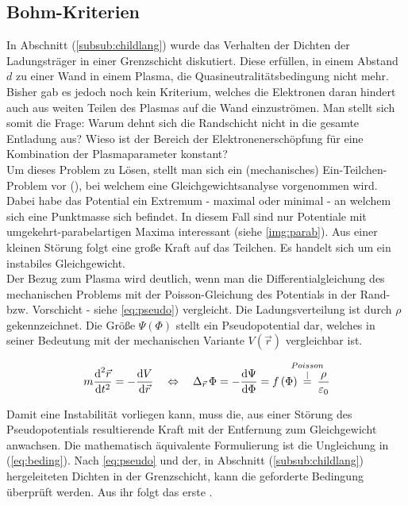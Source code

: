   \subsection{Bohm-Kriterien}

    In Abschnitt (\ref{subsub:childlang}) wurde das Verhalten der Dichten der Ladungstr\"ager in einer Grenzschicht diskutiert. Diese erf\"ullen, in einem Abstand $d$ zu einer Wand in einem Plasma, die Quasineutralit\"atsbedingung nicht mehr. Bisher gab es jedoch noch kein Kriterium, welches die Elektronen daran hindert auch aus weiten Teilen des Plasmas auf die Wand einzustr\"omen. Man stellt sich somit die Frage: Warum dehnt sich die Randschicht nicht in die gesamte Entladung aus? Wieso ist der Bereich der Elektronenersch\"opfung f\"ur eine Kombination der Plasmaparameter konstant? \\
    Um dieses Problem zu L\"osen, stellt man sich ein (mechanisches) Ein-Teilchen-Problem vor (\cite{Piel10}), bei welchem eine Gleichgewichtsanalyse vorgenommen wird. Dabei habe das Potential ein Extremum - maximal oder minimal - an welchem sich eine Punktmasse sich befindet. In diesem Fall sind nur Potentiale mit umgekehrt-parabelartigen Maxima interessant (siehe \autoref{img:parab}). Aus einer kleinen St\"orung folgt eine gro{\ss}e Kraft auf das Teilchen. Es handelt sich um ein instabiles Gleichgewicht.\\
    Der Bezug zum Plasma wird deutlich, wenn man die Differentialgleichung des mechanischen Problems mit der Poisson-Gleichung des Potentials in der Rand- bzw. Vorschicht - siehe \autoref{eq:pseudo}) vergleicht. Die Ladungsverteilung ist durch $\rho$ gekennzeichnet. Die Größe $\Psi\left(\Phi\right)$ stellt ein Pseudopotential dar, welches in seiner Bedeutung mit der mechanischen Variante $V\left(\vec{r}\right)$ vergleichbar ist.

      \begin{align}
        m\frac{\diff^{2}\vec{r}}{\diff t^{2}}=-\frac{\diff V}{\diff\vec{r}} \quad \Leftrightarrow \quad \Delta_{\vec{r}}\,\Phi=-\frac{\diff\Psi}{\diff\Phi}=f\left(\Phi\right)\hspace{-0.3cm}\overset{Poisson}{\overset{\mid}{=}}\hspace{-0.3cm}\frac{\rho}{\varepsilon\ix{0}} \label{eq:pseudo}
      \end{align}

    Damit eine Instabilit\"at vorliegen kann, muss die, aus einer St\"orung des Pseudopotentials resultierende Kraft mit der Entfernung zum Gleichgewicht anwachsen. Die mathematisch \"aquivalente Formulierung ist die Ungleichung in (\ref{eq:beding}). Nach \autoref{eq:pseudo} und der, in Abschnitt (\ref{subsub:childlang}) hergeleiteten Dichten in der Grenzschicht, kann die geforderte Bedingung \"uberpr\"uft werden. Aus ihr folgt das erste .

